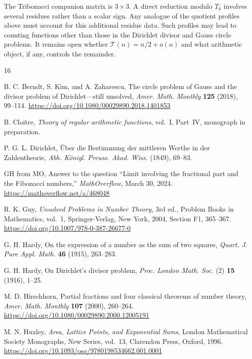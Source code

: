 \documentclass[11pt]{article}
\newcommand{\TT}{\mathcal T}
\begin{document}
The Tribonacci companion matrix is $3\times3$. A direct reduction modulo
$T_k$ involves several residues rather than a scalar sign. Any analogue of the
quotient profiles above must account for this additional residue data. Such
profiles may lead to counting functions other than those in the Dirichlet
divisor and Gauss circle problems. It remains open whether
$\TT(n)=n/2+o(n)$ and what arithmetic object, if any, controls the remainder.

\begin{thebibliography}{16}

B. C. Berndt, S. Kim, and A. Zaharescu,
The circle problem of Gauss and the divisor problem of Dirichlet---still
unsolved,
\emph{Amer. Math. Monthly} \textbf{125} (2018), 99--114.
\url{https://doi.org/10.1080/00029890.2018.1401853}

B. Cloitre,
\emph{Theory of regular arithmetic functions}, vol.~I, Part~IV,
monograph in preparation.

P. G. L. Dirichlet,
\"Uber die Bestimmung der mittleren Werthe in der Zahlentheorie,
\emph{Abh. K\"onigl. Preuss. Akad. Wiss.} (1849), 69--83.

GH from MO,
Answer to the question ``Limit involving the fractional part and the
Fibonacci numbers,''
\emph{MathOverflow}, March 30, 2024.
\url{https://mathoverflow.net/a/468048}

R. K. Guy,
\emph{Unsolved Problems in Number Theory}, 3rd ed.,
Problem Books in Mathematics, vol.~1, Springer-Verlag, New York, 2004,
Section F1, 365--367.
\url{https://doi.org/10.1007/978-0-387-26677-0}

G. H. Hardy,
On the expression of a number as the sum of two squares,
\emph{Quart. J. Pure Appl. Math.} \textbf{46} (1915), 263--283.

G. H. Hardy,
On Dirichlet's divisor problem,
\emph{Proc. London Math. Soc.} (2) \textbf{15} (1916), 1--25.

M. D. Hirschhorn,
Partial fractions and four classical theorems of number theory,
\emph{Amer. Math. Monthly} \textbf{107} (2000), 260--264.
\url{https://doi.org/10.1080/00029890.2000.12005191}

M. N. Huxley,
\emph{Area, Lattice Points, and Exponential Sums},
London Mathematical Society Monographs, New Series, vol.~13,
Clarendon Press, Oxford, 1996.
\url{https://doi.org/10.1093/oso/9780198534662.001.0001}


\end{thebibliography}
\end{document}
